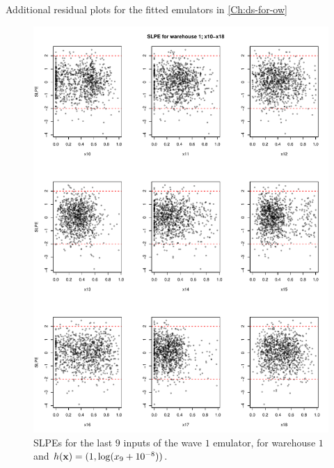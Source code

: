\begin{chapter}{Additional residual plots  for the fitted emulators in \cref{Ch:ds-for-ow} \label{App:resid}}
\begin{figure}
  \centering
  \includegraphics[width=\textwidth]{fig-app-ds/w1-w1-mean2.pdf}
  \caption{SLPEs for the last $9$ inputs of the wave $1$ emulator, for warehouse $1$ and $h(\mathbf{x}) = (1, \log (x_9 + 10^{-8}))$.}
\end{figure}
\begin{figure}
  \centering

\end{figure}
\end{chapter}
